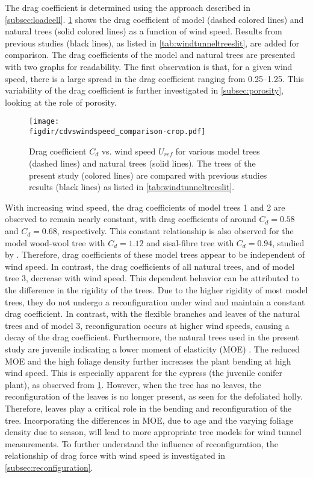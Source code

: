 The drag coefficient is determined using the approach described in \cref{subsec:loadcell}. \cref{fig:cdvswindspeed} shows the drag coefficient of model (dashed colored lines) and natural trees (solid colored lines) as a function of wind speed. Results from previous studies (black lines), as listed in \cref{tab:windtunneltreeslit}, are added for comparison. The drag coefficients of the model and natural trees are presented with two graphs for readability. The first observation is that, for a given wind speed, there is a large spread in the drag coefficient ranging from \numrange{0.25}{1.25}. This variability of the drag coefficient is further investigated in \cref{subsec:porosity}, looking at the role of porosity. 

	\begin{figure}[t]
		\centering
		\texttt{[image: \\figdir/cdvswindspeed\_comparison-crop.pdf]}
		\caption{Drag coefficient $C_d$ vs. wind speed $U_{\textit{ref}}$ for various model trees (dashed lines) and natural trees (solid lines). The trees of the present study (colored lines) are compared with previous studies results (black lines) as listed in \cref{tab:windtunneltreeslit}.}
		\label{fig:cdvswindspeed}
	\end{figure}

With increasing wind speed, the drag coefficients of model trees 1 and 2 are observed to remain nearly constant, with drag coefficients of around $C_d=0.58$ and $C_d=0.68$, respectively. This constant relationship is also observed for the model wood-wool tree with $C_d=1.12$ and sisal-fibre tree with $C_d=0.94$, studied by \cite{Gromke2008a}. Therefore, drag coefficients of these model trees appear to be independent of wind speed. In contrast, the drag coefficients of all natural trees, and of model tree 3, decrease with wind speed. This dependent behavior can be attributed to the difference in the rigidity of the trees. Due to the higher rigidity of most model trees, they do not undergo a reconfiguration under wind and maintain a constant drag coefficient. In contrast, with the flexible branches and leaves of the natural trees and of model 3, reconfiguration occurs at higher wind speeds, causing a decay of the drag coefficient. Furthermore, the natural trees used in the present study are juvenile indicating a lower moment of elasticity (MOE) \citep{Macdonald2002,Telewski1995,Watt2008}. The reduced MOE and the high foliage density further increases the plant bending at high wind speed. This is especially apparent for the cypress (the juvenile conifer plant), as observed from \cref{fig:cdvswindspeed}. However, when the tree has no leaves, the reconfiguration of the leaves is no longer present, as seen for the defoliated holly. Therefore, leaves play a critical role in the bending and reconfiguration of the tree. Incorporating the differences in MOE, due to age and the varying foliage density due to season, will lead to more appropriate tree models for wind tunnel measurements. To further understand the influence of reconfiguration, the relationship of drag force with wind speed is investigated in \cref{subsec:reconfiguration}.

